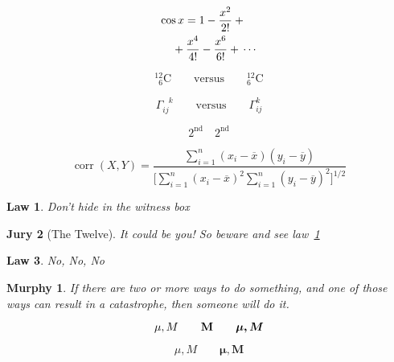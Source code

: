 \documentclass[a4paper,11pt,twocolumn]{article}
\begin{document}
\begin{spacing}{1.0}
\begin{eqnarray}
\lefteqn{ \cos x = 1
-\frac{x^{2}}{2!} +{} }
\nonumber\\
& & {}+\frac{x^{4}}{4!}
-\frac{x^{6}}{6!}+{}\cdots
\end{eqnarray}

\begin{displaymath}
{}^{12}_{\phantom{1}6}\textrm{C}
\qquad \textrm{versus} \qquad
{}^{12}_{6}\textrm{C}
\end{displaymath}

\begin{displaymath}
\Gamma_{ij}^{\phantom{ij}k}
\qquad \textrm{versus} \qquad
\Gamma_{ij}^{k}
\end{displaymath}

\begin{equation}
2^{\textrm{nd}} \quad
2^{\mathrm{nd}}
\end{equation}

\begin{displaymath}
\mathop{\mathrm{corr}}(X,Y)=
\frac{\displaystyle
\sum_{i=1}^n(x_i-\overline x)
(y_i-\overline y)}
{\displaystyle\biggl[
\sum_{i=1}^n(x_i-\overline x)^2
\sum_{i=1}^n(y_i-\overline y)^2
\biggr]^{1/2}}
\end{displaymath}

\newtheorem{law}{Law}
\newtheorem{jury}[law]{Jury}
\begin{law} \label{law:box}
Don’t hide in the witness box
\end{law}
\begin{jury}[The Twelve]
It could be you! So beware and
see law~\ref{law:box}\end{jury}
\begin{law}No, No, No\end{law}

\flushleft
\newtheorem{mur}{Murphy}[section]
\begin{mur}
If there are two or more
ways to do something, and
one of those ways can result
in a catastrophe, then
someone will do it.\end{mur}

\begin{displaymath}
\mu, M \qquad \mathbf{M} \qquad
\mbox{\boldmath $\mu, M$}
\end{displaymath}

\begin{displaymath}
\mu, M \qquad
\boldsymbol{\mu}, \boldsymbol{M}
\end{displaymath}

\end{spacing}
\end{document}
